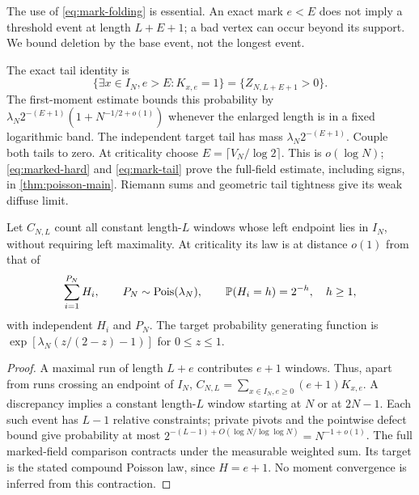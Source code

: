The use of \eqref{eq:mark-folding} is essential. An exact mark $e<E$ does
not imply a threshold event at length $L+E+1$; a bad vertex can occur beyond
its support. We bound deletion by the base event, not the longest event.

The exact tail identity is
\begin{equation}\label{eq:mark-tail}
 \{\exists x\in I_N,e>E:K_{x,e}=1\}=
                      \{Z_{N,L+E+1}>0\}.
\end{equation}
The first-moment estimate bounds this probability by
$\lambda_N2^{-(E+1)}(1+N^{-1/2+o(1)})$ whenever the enlarged length is in
a fixed logarithmic band. The independent target tail has mass
$\lambda_N2^{-(E+1)}$. Couple both tails to zero.
At criticality choose $E=\lceil V_N/\log2\rceil$. This is $o(\log N)$;
\eqref{eq:marked-hard} and \eqref{eq:mark-tail} prove the full-field
estimate, including signs, in \cref{thm:poisson-main}. Riemann sums and
geometric tail tightness give its weak diffuse limit.

\begin{corollary}
\label{cor:window-clusters}
Let $C_{N,L}$ count all constant length-$L$ windows whose left endpoint
lies in $I_N$, without requiring left maximality. At criticality its law
is at distance $o(1)$ from that of
\[
 \sum_{i=1}^{P_N}H_i,\qquad P_N\sim\operatorname{Pois}(\lambda_N),\qquad
 \mathbb P(H_i=h)=2^{-h},\quad h\ge1,
\]
with independent $H_i$ and $P_N$. The target probability generating function
is $\exp[\lambda_N(z/(2-z)-1)]$ for $0\le z\le1$.
\end{corollary}
\begin{proof}
A maximal run of length $L+e$ contributes $e+1$ windows. Thus, apart from
runs crossing an endpoint of $I_N$,
$C_{N,L}=\sum_{x\in I_N,e\ge0}(e+1)K_{x,e}$.
A discrepancy implies a constant length-$L$ window starting at $N$ or
at $2N-1$. Each such event has $L-1$ relative constraints; private pivots
and the pointwise defect bound give probability at most
$2^{-(L-1)+O(\log N/\log\log N)}=N^{-1+o(1)}$.
The full marked-field comparison contracts under the measurable weighted
sum. Its target is the stated compound Poisson law, since $H=e+1$.
No moment convergence is inferred from this contraction.
\end{proof}

